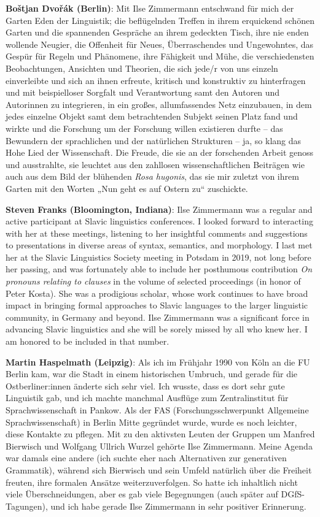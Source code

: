 \documentclass[output=paper,colorlinks,citecolor=brown]{langscibook}
\begin{document}
\noindent \textbf{Boštjan Dvořák (Berlin)}: Mit Ilse Zimmermann entschwand für mich der Garten Eden der Linguistik; die beflügelnden Treffen in ihrem erquickend schönen Gar\-ten und die spannenden Gespräche an ihrem gedeckten Tisch, ihre nie enden wollende Neugier, die Offenheit für Neues, Überraschendes und Ungewohntes, das Gespür für Regeln und Phänomene, ihre Fähigkeit und Mühe, die verschiedensten Beobachtungen, Ansichten und Theorien, die sich jede/r von uns einzeln einverleibte und sich an ihnen erfreute, kritisch und konstruktiv zu hinterfragen und mit beispielloser Sorgfalt und Verantwortung samt den Autoren und Autorinnen zu integrieren, in ein großes, allumfassendes Netz einzubauen, in dem jedes einzelne Objekt samt dem betrachtenden Subjekt seinen Platz fand und wirkte und die Forschung um der Forschung willen existieren durfte -- das Bewundern der sprachlichen und der natürlichen Strukturen -- ja, so klang das Hohe Lied der Wissenschaft. Die Freude, die sie an der forschenden Arbeit genoss und ausstrahlte, sie leuchtet aus den zahllosen wissenschaftlichen Beiträgen wie auch aus dem Bild der blühenden \textit{Rosa hugonis}, das sie mir zuletzt von ihrem Garten mit den Worten „Nun geht es auf Ostern zu“ zuschickte. \medskip

\noindent \textbf{Steven Franks (Bloomington, Indiana)}: Ilse Zimmermann was a regular and active participant at Slavic linguistics conferences. I looked forward to interacting with her at these meetings, listening to her insightful comments and suggestions to presentations in diverse areas of syntax, semantics, and morphology. I last met her at the Slavic Linguistics Society meeting in Potsdam in 2019, not long before her passing, and was fortunately able to include her posthumous contribution \textit{On pronouns relating to clauses} in the volume of selected proceedings (in honor of Peter Kosta). She was a prodigious scholar, whose work continues to have broad impact in bringing formal approaches to Slavic languages to the larger linguistic community, in Germany and beyond. Ilse Zimmermann was a significant force in advancing Slavic linguistics and she will be sorely missed by all who knew her. I am honored to be included in that number.

\noindent \textbf{Martin Haspelmath (Leipzig)}: Als ich im Frühjahr 1990 von Köln an die FU Berlin kam, war die Stadt in einem historischen Umbruch, und gerade für die Ostberliner:innen änderte sich sehr viel. Ich wusste, dass es dort sehr gute Linguistik gab, und ich machte manchmal Ausflüge zum Zentralinstitut für Sprachwissenschaft in Pankow. Als der FAS (Forschungsschwerpunkt Allgemeine Sprachwissenschaft) in Berlin Mitte gegründet wurde, wurde es noch leichter, diese Kontakte zu pflegen. Mit zu den aktivsten Leuten der Gruppen um Manfred Bierwisch und Wolfgang Ullrich Wurzel gehörte Ilse Zimmermann. Meine Agenda war damals eine andere (ich suchte eher nach Alternativen zur generativen Grammatik), während sich Bierwisch und sein Umfeld natürlich über die Freiheit freu\-ten, ihre formalen Ansätze weiterzuverfolgen. So hatte ich inhaltlich nicht viele Überschneidungen, aber es gab viele Begegnungen (auch später auf DGfS-Ta\-gun\-gen), und ich habe gerade Ilse Zimmermann in sehr positiver Erinnerung. \medskip
\end{document}
